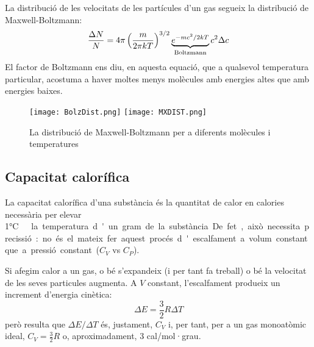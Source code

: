 La distribució de les velocitats de les partícules d'un gas segueix la distribució de Maxwell-Boltzmann\cite{mahan_quimica_1997}:
\[
\frac{\Delta N}{N}=4 \pi \left( \frac{m}{2 \pi kT}\right)^{3/2} \underbrace{e^{-mc^2/2kT}}_{\rm Boltzmann} c^2 \Delta c
\]
El factor de Boltzmann ens diu, en aquesta equació, que a qualsevol temperatura particular, acostuma a haver moltes menys molècules amb energies altes que amb energies baixes.
\begin{figure}[h]
\centering
\texttt{[image: BolzDist.png]}
\texttt{[image: MXDIST.png]}
\caption{La distribució de Maxwell-Boltzmann per a diferents molècules i temperatures}
\label{fig:Maxwell}
\end{figure}




\subsection{Capacitat calorífica}

La capacitat calorífica d'una substància és la quantitat de calor en calories necessària per elevar 1\si\degreeCelsius\ la temperatura d'un gram de la substància.

De fet, això necessita precissió: no és el mateix fer aquest procés d'escalfament a volum constant que a pressió constant ($C_V$ vs $C_P$).

Si afegim calor a un gas, o bé s'expandeix (i per tant fa treball) o bé la velocitat de les seves particules augmenta.
A $V$ constant, l'escalfament produeix un increment d'energia cinètica:
\[\Delta E = \frac{3}{2} R \Delta T\]
però resulta que $\Delta E/ \Delta T$ és, justament, $C_V$ i, per tant, per a un gas monoatòmic ideal, $C_V=\frac{3}{2}R$ o, aproximadament, 3 cal/mol·grau.

